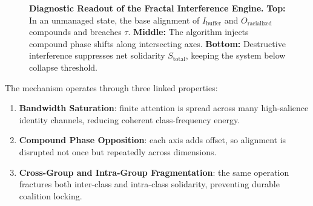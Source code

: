 \documentclass[12pt,openany]{book}
\begin{document}
\begin{figure}[htbp]
\caption{\textbf{Diagnostic Readout of the Fractal Interference Engine.} \textbf{Top:} In an unmanaged state, the base alignment of $I_{\text{buffer}}$ and $O_{\text{racialized}}$ compounds and breaches $\tau$. \textbf{Middle:} The algorithm injects compound phase shifts along intersecting axes. \textbf{Bottom:} Destructive interference suppresses net solidarity $S_{\text{total}}$, keeping the system below collapse threshold.}
\label{fig:fractal-oscilloscope}
\end{figure}

The mechanism operates through three linked properties:
\begin{enumerate}
    \item \textbf{Bandwidth Saturation}: finite attention is spread across many high-salience identity channels, reducing coherent class-frequency energy.
    \item \textbf{Compound Phase Opposition}: each axis adds offset, so alignment is disrupted not once but repeatedly across dimensions.
    \item \textbf{Cross-Group and Intra-Group Fragmentation}: the same operation fractures both inter-class and intra-class solidarity, preventing durable coalition locking.
\end{enumerate}
\end{document}
